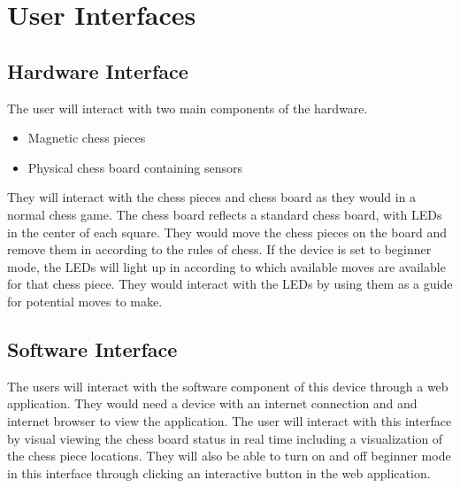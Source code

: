\documentclass[12pt, titlepage]{article}
\begin{document}
\section{User Interfaces}

\subsection{Hardware Interface}
The user will interact with two main components of the hardware.
\begin{itemize}
  \item Magnetic chess pieces
  \item Physical chess board containing sensors
\end{itemize}
They will interact with the chess pieces and chess board as they would in a normal chess game. The chess board reflects a standard chess board, with 
LEDs in the center of each square. They would move the chess pieces on the board and remove them in according to the rules of chess. If the device
is set to beginner mode, the LEDs will light up in according to which available moves are available for that chess piece. They would interact with the LEDs
by using them as a guide for potential moves to make.

\subsection{Software Interface}
The users will interact with the software component of this device through a web application. They would need a device with an internet connection and and internet browser
to view the application. The user will interact with this interface by visual viewing the chess board status in real time including a visualization of the chess piece locations.
They will also be able to turn on and off beginner mode in this interface through clicking an interactive button in the web application. 
\end{document}
